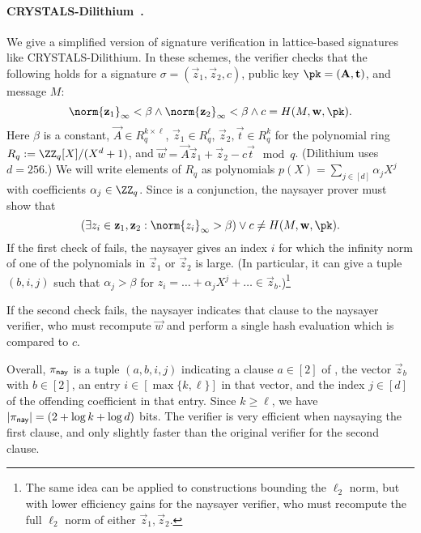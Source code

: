 \paragraph{CRYSTALS-Dilithium~\cite{TCHES:DKLLS18}.} We give a simplified version of signature verification in lattice-based signatures like CRYSTALS-Dilithium. In these schemes, the verifier checks that the following holds for a signature $\sigma=(\vec{z}_1,\vec{z}_2,c)$, public key $\pk=(\vec{A},\vec{t})$, and message $M$:
\begin{equation}\label{eq:crystals_verifier_check}
    \norm{\vec{z}_1}_\infty < \beta \land
    \norm{\vec{z}_2}_\infty < \beta \land 
    c=H(M, \vec{w}, \pk).
\end{equation}
Here $\beta$ is a constant, $\vec{A}\in R_q^{k\times \ell}$, $\vec{z}_1 \in R_q^\ell$, $\vec{z}_2,\vec{t}\in R_q^k$ for the polynomial ring $R_q:=\ZZ_q[X]/(X^d+1)$, and $\vec{w} = \vec{A}\vec{z}_1+\vec{z}_2-c\vec{t} \mod{q}$. (Dilithium uses $d=256$.) We will write elements of $R_q$ as polynomials $p(X) = \sum_{j\in[d]} \alpha_j X^j$ with coefficients $\alpha_j \in \ZZ_q$.
Since  is a conjunction, the naysayer prover must show that
\begin{equation}\label{eq:crystals_naysayer_prover}
    \left( \exists z_i \in \vec{z}_1,\vec{z}_2: \norm{z_i}_\infty > \beta \right) \lor 
    c\neq H(M, \vec{w}, \pk).
\end{equation}
If the first check of  fails, the naysayer gives an index $i$ for which the infinity norm of one of the polynomials in $\vec{z}_1$ or $\vec{z}_2$ is large. (In particular, it can give a tuple $(b,i,j)$ such that $\alpha_j > \beta$ for $z_i = \dots + \alpha_j X^j + \dots \in \vec{z}_b$.)\footnote{The same idea can be applied to constructions bounding the $\ell_2$ norm, but with lower efficiency gains for the naysayer verifier, who must recompute the full $\ell_2$ norm of either $\vec{z}_1,\vec{z}_2$.}

If the second check fails, the naysayer indicates that clause to the naysayer verifier, who must recompute $\vec{w}$ and perform a single hash evaluation which is compared to $c$.

Overall, $\pi_{\mathsf{nay}}$ is a tuple $(a, b, i, j)$ indicating a clause $a \in [2]$ of , the vector $\vec{z}_b$ with $b \in [2]$, an entry $i \in [\max\{k,\ell\}]$ in that vector, and the index $j \in [d]$ of the offending coefficient in that entry. Since $k \geq \ell$, we have $\lvert \pi_{\mathsf{nay}} \rvert = (2+\log{k}+\log{d})$ bits. The verifier is very efficient when naysaying the first clause, and only slightly faster than the original verifier for the second clause.

